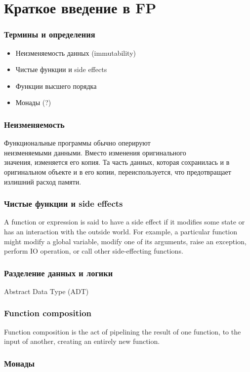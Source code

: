 \documentclass[14pt, compress, aspectratio=169]{beamer}
\begin{document}
\section{Краткое введение в FP}

\begin{frame}[fragile]
    \frametitle{Термины и определения}
    \begin{itemize}[label={\MVRightarrow}]
        \item Неизменяемость данных (immutability)
        \item Чистые функции и side effects
        \item Функции высшего порядка
        \item Монады (?)
    \end{itemize}
\end{frame}

\begin{frame}
    \frametitle{Неизменяемость}
    Функциональные программы обычно оперируют \\
    неизменяемыми данными. Вместо изменения оригинального\\
    значения, изменяется его копия. Та часть данных,
    которая сохранилась и в оригинальном объекте и в его копии,
    переиспользуется, что предотвращает излишний расход памяти.
\end{frame}

\begin{frame}
    \frametitle{Чистые функции и side effects}
    A function or expression is said to have a side effect if it modifies some
    state or has an interaction with the outside world. For example, a
    particular function might modify a global variable, modify one of its
    arguments, raise an exception, perform IO operation, or call other
    side-effecting functions.
\end{frame}

\begin{frame}
    \frametitle{Разделение данных и логики}
    Abstract Data Type (ADT)
\end{frame}

\begin{frame}
    \frametitle{Function composition}
    Function composition is the act of pipelining the result of one function,
    to the input of another, creating an entirely new function.
\end{frame}

\begin{frame}
    \frametitle{Монады}
\end{frame}
\end{document}
